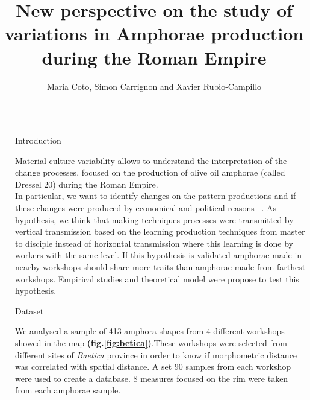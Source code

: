 \documentclass[final]{beamer}
\title{New perspective on the study of variations in Amphorae production during the Roman Empire} %
\author{Maria Coto, Simon Carrignon and Xavier Rubio-Campillo} %
\institute{Barcelona Supercomputing Center - University of Barcelona} %
\newlength{\sepwid}
\newlength{\onecolwid}
\begin{document}

\setlength{\belowcaptionskip}{2ex} %
\setlength\belowdisplayshortskip{2ex} %

\begin{frame}[t] %

\begin{columns}[t] %

\begin{column}{\sepwid}\end{column} %

\begin{column}{\onecolwid} %


\begin{block}{Introduction}

Material culture variability allows to understand the interpretation of the change processes, focused on the production of olive oil amphorae (called Dressel 20) during the Roman Empire. \\
In particular, we want to identify changes on the pattern productions and if these changes were produced by economical and political reasons ~\cite{schillinger_differences_2016}. As
hypothesis, we think that making techniques processes were transmitted by vertical transmission based on the learning production techniques from master to disciple instead of horizontal transmission where this learning is done by workers with the same level. If this hypothesis is validated amphorae made in nearby workshops should share more traits than amphorae made from farthest workshops. Empirical studies and theoretical model were propose to test this hypothesis. 
\end{block}


\begin{block}{Dataset}


    We analysed a sample of 413 amphora shapes from 4 different workshops showed in the map \textbf{(fig.\ref{fig:betica})}.These workshops were selected from different sites of \emph{Baetica} province in order to know if morphometric distance was correlated with spatial distance. A set 90 samples from each workshop were used to create a database. 8 measures focused on the rim were taken from each amphorae sample. 


\end{block}
\end{column}
\end{columns}
\end{frame}
\end{document}
